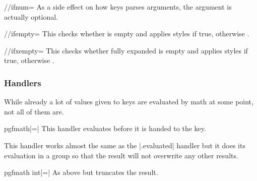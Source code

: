 \begin{multicols}{2}
\begin{key}{/\utilsext/ifnum=}
  As a side effect on how \pgfname keys parses arguments, the  argument is
  actually optional.
\end{key}


\begin{key}{/\utilsext/ifempty=}
  This checks whether  is empty and applies styles  if true,
  otherwise .
\end{key}
\begin{key}{/\utilsext/ifxempty=}
  This checks whether fully expanded  is empty and applies styles  if true,
  otherwise .
\end{key}

\subsubsection{Handlers}

While already a lot of values given to keys are evaluated by \pgfname math at some point,
not all of them are.

\begin{ext_handler}{{pgfmath}|=|}
  This handler evaluates  before it is handed to the key.
  
  This handler works almost the same as the |.evaluated|
  handler but it does its evaluation in a group so that the result will 
  not overwrite any other results.
\end{ext_handler}

\begin{ext_handler}{{pgfmath int}|=|}
  As above but truncates the result.
\end{ext_handler}



\end{multicols}
